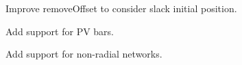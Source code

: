 
\begin{DoxyRefList}
\item[\label{todo__todo000001}%
\hypertarget{todo__todo000001}{}%
Class \hyperlink{class_redraw_network}{Redraw\+Network} ]Improve remove\+Offset to consider slack initial position.  
\item[\label{todo__todo000002}%
\hypertarget{todo__todo000002}{}%
Class \hyperlink{class_shirmoharmmadi}{Shirmoharmmadi} ]Add support for P\+V bars. 

Add support for non-\/radial networks. 
\end{DoxyRefList}